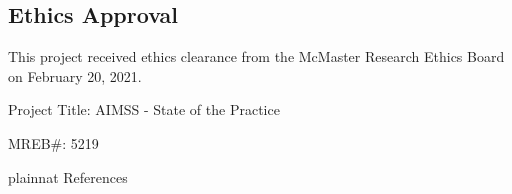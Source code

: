 \documentclass[12pt, notitlepage]{article}
\begin{document}
\begin{singlespace}
\subsection{Ethics Approval}
This project received ethics clearance from the McMaster Research Ethics Board on February 20, 2021.\newline


Project Title: AIMSS - State of the Practice\newline


MREB\#: 5219



\newpage

 {plainnat}
 {References}

\end{singlespace}
\end{document}

